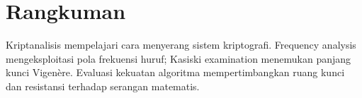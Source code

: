 \section*{Rangkuman}
Kriptanalisis mempelajari cara menyerang sistem kriptografi. Frequency analysis mengeksploitasi pola frekuensi huruf; Kasiski examination menemukan panjang kunci Vigenère. Evaluasi kekuatan algoritma mempertimbangkan ruang kunci dan resistansi terhadap serangan matematis.

